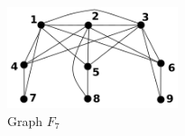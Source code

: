  \begin{figure}[htb]	
 \center%
 \includegraphics[width=5cm]{./img/f7.png}
 \caption{Graph $F_7$}
\label{fig:f7}
\end{figure}  
 